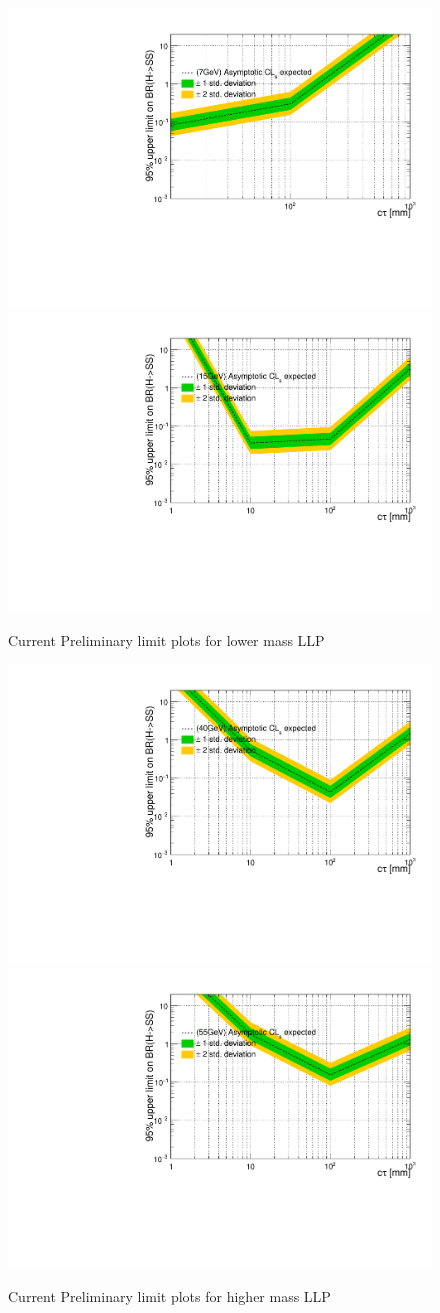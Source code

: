\begin{figure}[h!]
   \label{fig:Limit}
   \centering
   \includegraphics[width=0.48\linewidth]{figs/7GeVUpperLimit.pdf}
   \includegraphics[width=0.48\linewidth]{figs/15GeVUpperLimit.pdf}
   \caption{Current Preliminary limit plots for lower mass LLP}
 \end{figure}
 \begin{figure}[h!]
   \label{fig:Limit2}
   \centering
   \includegraphics[width=0.48\linewidth]{figs/40GeVUpperLimit.pdf}
   \includegraphics[width=0.48\linewidth]{figs/55GeVUpperLimit.pdf}
   \caption{Current Preliminary limit plots for higher mass LLP}
 \end{figure}
